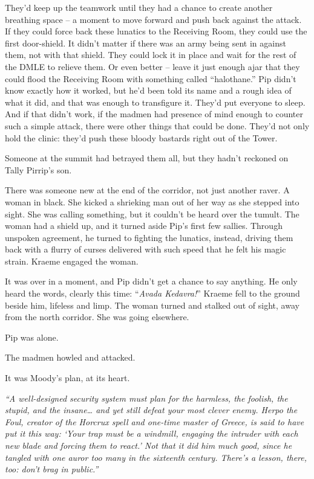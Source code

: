 They'd keep up the teamwork until they had a chance to create another
breathing space -- a moment to move forward and push back against the
attack. If they could force back these lunatics to the Receiving Room,
they could use the first door-shield. It didn't matter if there was an
army being sent in against them, not with that shield. They could lock
it in place and wait for the rest of the DMLE to relieve them. Or even
better -- leave it just enough ajar that they could flood the Receiving
Room with something called ``halothane.'' Pip didn't know exactly how it
worked, but he'd been told its name and a rough idea of what it did, and
that was enough to transfigure it. They'd put everyone to sleep. And if
that didn't work, if the madmen had presence of mind enough to counter
such a simple attack, there were other things that could be done. They'd
not only hold the clinic: they'd push these bloody bastards right out of
the Tower.

Someone at the summit had betrayed them all, but they hadn't reckoned on
Tally Pirrip's son.

There was someone new at the end of the corridor, not just another
raver. A woman in black. She kicked a shrieking man out of her way as
she stepped into sight. She was calling something, but it couldn't be
heard over the tumult. The woman had a shield up, and it turned aside
Pip's first few sallies. Through unspoken agreement, he turned to
fighting the lunatics, instead, driving them back with a flurry of
curses delivered with such speed that he felt his magic strain. Kraeme
engaged the woman.

It was over in a moment, and Pip didn't get a chance to say anything. He
only heard the words, clearly this time: ``\emph{Avada Kedavra!}''
Kraeme fell to the ground beside him, lifeless and limp. The woman
turned and stalked out of sight, away from the north corridor. She was
going elsewhere.

Pip was alone.

The madmen howled and attacked.

\mybreak

It was Moody's plan, at its heart.

\emph{``A well-designed security system must plan for the harmless, the
foolish, the stupid, and the insane\ldots{} and yet still defeat your
most clever enemy. Herpo the Foul, creator of the Horcrux spell and
one-time master of Greece, is said to have put it this way: `Your trap
must be a windmill, engaging the intruder with each new blade and
forcing them to react.' Not that it did him much good, since he tangled
with one auror too many in the sixteenth century. There's a lesson,
there, too: don't brag in public.''}


